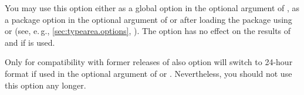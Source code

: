 You may use this option either as a global option in the optional argument of
, as a package option in the optional
argument of  or after loading the package
using  or 
(see, e.\,g., \autoref{sec:typearea.options},
).  The option has no effect on the
results of  and 
if  is used.

Only for compatibility with former releases of
 also option  will switch to 24-hour format if
used in the optional argument of  or
. Nevertheless, you should not use this option any longer.%
\EndIndexGroup
%
\EndIndexGroup

\endinput

